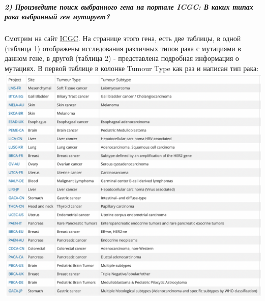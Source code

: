 \documentclass[12pt]{article}
\begin{document}
\subparagraph{2) Произведите поиск выбранного гена на портале ICGC: В каких типах рака выбранный ген мутирует?\\}
Смотрим на сайт \href{https://dcc.icgc.org/genes/ENSG00000185920/mutations?mutations}{ICGC}. На странице этого гена, есть две таблицы, в одной (таблица 1) отображены исследования различных типов рака с мутациями в данном гене, в другой (таблица 2) - представлена подробная информация о мутациях. В первой таблице в колонке Tumour Type как раз и написан тип рака:\\
\includegraphics[width=\textwidth]{images/image5.png}\\\\
\pagebreak
\end{document}
